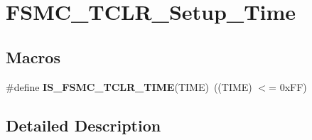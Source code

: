 \hypertarget{group___f_s_m_c___t_c_l_r___setup___time}{}\section{F\+S\+M\+C\+\_\+\+T\+C\+L\+R\+\_\+\+Setup\+\_\+\+Time}
\label{group___f_s_m_c___t_c_l_r___setup___time}
\subsection*{Macros}
\begin{DoxyCompactItemize}
\item 
\hypertarget{group___f_s_m_c___t_c_l_r___setup___time_ga324848d0d9c0d2aad7ab70873b4a15e9}{}\#define {\bfseries I\+S\+\_\+\+F\+S\+M\+C\+\_\+\+T\+C\+L\+R\+\_\+\+T\+I\+M\+E}(T\+I\+M\+E)~((T\+I\+M\+E) $<$= 0x\+F\+F)\label{group___f_s_m_c___t_c_l_r___setup___time_ga324848d0d9c0d2aad7ab70873b4a15e9}

\end{DoxyCompactItemize}


\subsection{Detailed Description}
